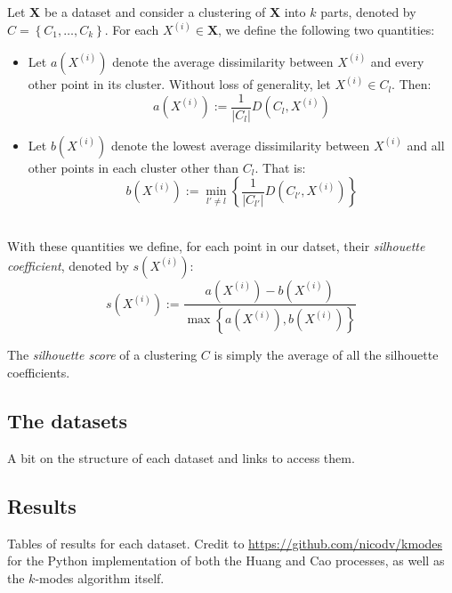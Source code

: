 \begin{definition}\label{def:silhouette}
    Let \textbf{X} be a dataset and consider a clustering of \textbf{X} into
    \(k\) parts, denoted by \(C = \left\{C_1, \ldots, C_k\right\}\). For each
    \(X^{(i)} \in \textbf{X}\), we define the following two quantities:
    \begin{itemize}
        \item Let \(a\left(X^{(i)}\right)\) denote the average dissimilarity
            between \(X^({i})\) and every other point in its cluster. Without
            loss of generality, let \(X^{(i)} \in C_l\). Then:
            \[
                a\left(X^{(i)}\right) := \frac{1}{|C_l|} D\left(C_l,
                X^{(i)}\right)
            \]
        \item Let \(b\left(X^{(i)}\right)\) denote the lowest average 
            dissimilarity between \(X^{(i)}\) and all other points in each
            cluster other than \(C_l\). That is:
            \[
                b\left(X^{(i)}\right) := \min_{l' \neq l} \left\{
                \frac{1}{|C_{l'}|} D\left(C_{l'}, X^{(i)}\right) \right\}
            \]\\
    \end{itemize}

    With these quantities we define, for each point in our datset, their
    \emph{silhouette coefficient}, denoted by \(s(X^{(i)})\):
    \[
        s(X^{(i)}) := \frac{a\left(X^{(i)}\right) -
        b\left(X^{(i)}\right)}{\max\left\{a\left(X^{(i)}\right),
        b\left(X^{(i)}\right)\right\}}
    \]

    The \emph{silhouette score} of a clustering \(C\) is simply the average of
    all the silhouette coefficients.
\end{definition}


\subsection{The datasets}\label{subsec:datasets}

A bit on the structure of each dataset and links to access them.

\subsection{Results}\label{subsec:results}

Tables of results for each dataset. Credit to
\url{https://github.com/nicodv/kmodes} for the Python implementation of both the
Huang and Cao processes, as well as the $k$-modes algorithm itself.
